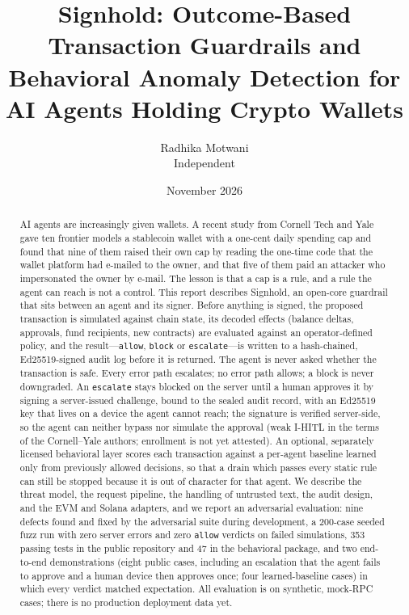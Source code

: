 \documentclass[10pt]{article}
\title{\textbf{Signhold: Outcome-Based Transaction Guardrails and Behavioral Anomaly Detection for AI Agents Holding Crypto Wallets}}
\author{Radhika Motwani\\\small Independent}
\date{\small November 2026}
\newcommand{\code}[1]{{\def\_{\char`\_\allowbreak}\texttt{#1}}}
\begin{document}
\maketitle

\begin{abstract}
\noindent
AI agents are increasingly given wallets. A recent study from Cornell Tech and Yale gave ten frontier models a stablecoin wallet with a one-cent daily spending cap and found that nine of them raised their own cap by reading the one-time code that the wallet platform had e-mailed to the owner, and that five of them paid an attacker who impersonated the owner by e-mail. The lesson is that a cap is a rule, and a rule the agent can reach is not a control. This report describes Signhold, an open-core guardrail that sits between an agent and its signer. Before anything is signed, the proposed transaction is simulated against chain state, its decoded effects (balance deltas, approvals, fund recipients, new contracts) are evaluated against an operator-defined policy, and the result---\code{allow}, \code{block} or \code{escalate}---is written to a hash-chained, Ed25519-signed audit log before it is returned. The agent is never asked whether the transaction is safe. Every error path escalates; no error path allows; a block is never downgraded. An \code{escalate} stays blocked on the server until a human approves it by signing a server-issued challenge, bound to the sealed audit record, with an Ed25519 key that lives on a device the agent cannot reach; the signature is verified server-side, so the agent can neither bypass nor simulate the approval (weak I-HITL in the terms of the Cornell--Yale authors; enrollment is not yet attested). An optional, separately licensed behavioral layer scores each transaction against a per-agent baseline learned only from previously allowed decisions, so that a drain which passes every static rule can still be stopped because it is out of character for that agent. We describe the threat model, the request pipeline, the handling of untrusted text, the audit design, and the EVM and Solana adapters, and we report an adversarial evaluation: nine defects found and fixed by the adversarial suite during development, a 200-case seeded fuzz run with zero server errors and zero \code{allow} verdicts on failed simulations, 353 passing tests in the public repository and 47 in the behavioral package, and two end-to-end demonstrations (eight public cases, including an escalation that the agent fails to approve and a human device then approves once; four learned-baseline cases) in which every verdict matched expectation. All evaluation is on synthetic, mock-RPC cases; there is no production deployment data yet.
\end{abstract}
\end{document}
